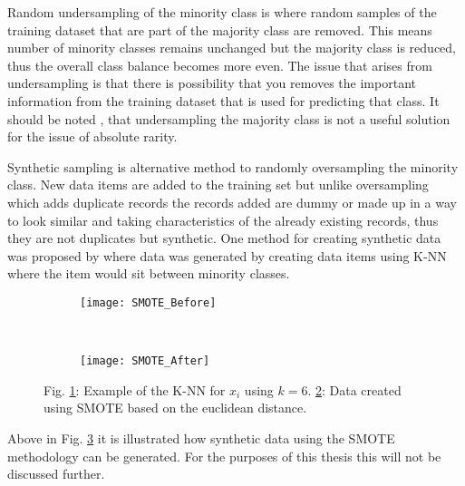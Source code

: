 Random undersampling of the minority class is where random samples of the training dataset that are part of the majority class are removed. This means number of minority classes remains unchanged but the majority class is reduced, thus the overall class balance becomes more even. The issue that arises from undersampling is that there is possibility that you removes the important information from the training dataset that is used for predicting that class. It should be noted \cite{kennedy_credit_2013}, that undersampling the majority class is not a useful solution for the issue of absolute rarity.

Synthetic sampling  is alternative method to randomly oversampling the minority class. New data items are added to the training set but unlike oversampling which adds duplicate records the records added are dummy or made up in a way to look similar and taking characteristics of the already existing records, thus they are not duplicates but synthetic. One method for creating synthetic data was proposed by \citep{chawla_smote:_2002} where data was generated by creating data items using K-NN where the item would sit between minority classes. 

\begin{figure}[H]
	\centering
	\begin{subfigure}[b]{0.32\textwidth}
		\captionsetup{font=scriptsize}
		\texttt{[image: SMOTE\_Before]}\caption{}
		\label{fig:SMOTE_Before}
	\end{subfigure}  ~\quad
	\begin{subfigure}[b]{0.32\textwidth}
		\captionsetup{font=scriptsize}
		\texttt{[image: SMOTE\_After]}
		\caption{}
		\label{fig:SMOTE_After}
	\end{subfigure}
	\caption{Fig. \ref{fig:SMOTE_Before}: Example of the K-NN for $x_i$ using $k = 6$. \ref{fig:SMOTE_After}: Data created using SMOTE based on the euclidean distance.\\
		\cite[Source:][]{he_learning_2009}}
	\label{fig:smoteExample}
\end{figure}

Above in Fig. \ref{fig:smoteExample} it is illustrated how synthetic data using the SMOTE methodology can be generated. For the purposes of this thesis this will not be discussed further.

